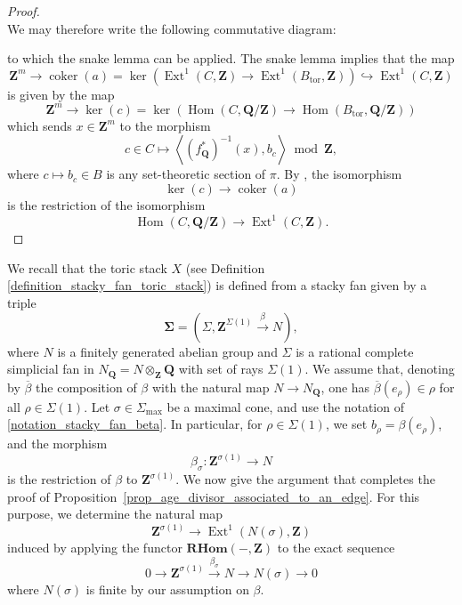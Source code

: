 \documentclass{proc-l}
\newcommand{\Z}{\mathbf{Z}}
\newcommand{\Q}{\mathbf{Q}}
\DeclareMathOperator{\Hom}{Hom}
\DeclareMathOperator{\Ext}{Ext}
\DeclareMathOperator{\coker}{coker}
\DeclareMathOperator{\tor}{tor}
\theoremstyle{definition}
\theoremstyle{remark}
\numberwithin{equation}{section}
\begin{document}
\begin{proof}
\[\]
We may therefore write the following commutative diagram:
\begin{center}
\end{center}to which the snake lemma can be applied. The snake lemma implies that the map
$$\Z^m \rightarrow \coker(a) = \ker\left(\Ext^1(C,\Z) \rightarrow \Ext^1(B_{\tor},\Z) \right) \hookrightarrow  \Ext^1(C,\Z) $$is given by the map
\[
\Z^m \longrightarrow \ker(c) =
\ker\!\left(
\Hom(C,\Q/\Z) \longrightarrow \Hom(B_{\tor},\Q/\Z)
\right)
\]
which sends $x \in \Z^{m}$ to the morphism
\[
c \in C \longmapsto \left\langle (f_{\Q}^*)^{-1} (x), b_c \right\rangle \bmod \Z,
\]
where $c \mapsto b_c \in B$ is any set-theoretic section of $\pi$. By \cite[Addendum 1.3.3]{weibel1994homological}, the isomorphism
\[
\ker(c) \longrightarrow \coker(a)
\]
is the restriction of the isomorphism
\[
\Hom(C,\Q/\Z) \longrightarrow \Ext^1(C,\Z).
\]
\end{proof}


We recall that the toric stack $X$ (see Definition \ref{definition_stacky_fan_toric_stack}) is defined from a stacky fan given by a triple
\[
\mathbf{\Sigma} = (\Sigma, \Z^{\Sigma(1)} \xrightarrow{\beta} N),
\]
where $N$ is a finitely generated abelian group and $\Sigma$ is a rational complete simplicial fan in $N_{\Q} = N \otimes_{\Z} \Q$ with set of rays $\Sigma(1)$. We assume that, denoting by $\overline{\beta}$ the composition of $\beta$ with the natural map $N \rightarrow N_{\Q}$, one has $\overline{\beta}(e_{\rho}) \in \rho$ for all $\rho \in \Sigma(1)$. Let $\sigma \in \Sigma_{\max}$ be a maximal cone, and use the notation of \ref{notation_stacky_fan_beta}. In particular, for $\rho \in \Sigma(1)$, we set $b_{\rho} = \beta(e_{\rho})$, and the morphism
\[
\beta_{\sigma} : \Z^{\sigma(1)} \longrightarrow N
\]
is the restriction of $\beta$ to $\Z^{\sigma(1)}$. We now give the argument that completes the proof of Proposition~\ref{prop_age_divisor_associated_to_an_edge}. For this purpose, we determine the natural map
\[
\Z^{\sigma(1)} \longrightarrow \Ext^1(N(\sigma),\Z)
\]
induced by applying the functor $\mathbf{RHom}(-,\Z)$ to the exact sequence
\begin{equation}\label{equation_exact_sequence_proof_proposition}
0 \longrightarrow \Z^{\sigma(1)} \xrightarrow{\beta_{\sigma}} N \longrightarrow N(\sigma) \longrightarrow 0   
\end{equation}where $N(\sigma)$ is finite by our assumption on $\beta$.
\end{document}
